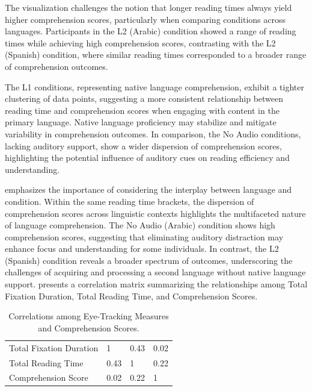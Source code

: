 The visualization challenges the notion that longer reading times always
yield higher comprehension scores, particularly when comparing
conditions across languages. Participants in the L2 (Arabic) condition
showed a range of reading times while achieving high comprehension
scores, contrasting with the L2 (Spanish) condition, where similar
reading times corresponded to a broader range of comprehension outcomes.

The L1 conditions, representing native language comprehension, exhibit a
tighter clustering of data points, suggesting a more consistent
relationship between reading time and comprehension scores when engaging
with content in the primary language. Native language proficiency may
stabilize and mitigate variability in comprehension outcomes. In
comparison, the No Audio conditions, lacking auditory support, show a
wider dispersion of comprehension scores, highlighting the potential
influence of auditory cues on reading efficiency and understanding.

 emphasizes the importance of considering the interplay between
language and condition. Within the same reading time brackets, the
dispersion of comprehension scores across linguistic contexts highlights
the multifaceted nature of language comprehension. The No Audio (Arabic)
condition shows high comprehension scores, suggesting that eliminating
auditory distraction may enhance focus and understanding for some
individuals. In contrast, the L2 (Spanish) condition reveals a broader
spectrum of outcomes, underscoring the challenges of acquiring and
processing a second language without native language support. 
presents a correlation matrix summarizing the relationships among Total
Fixation Duration, Total Reading Time, and Comprehension Scores.

\begin{table}[htbp]
\centering
\begin{threeparttable}
\caption{Correlations among Eye-Tracking Measures and Comprehension Scores.}
\label{tab-06}
\begin{tabular}{llll}
\toprule
Total Fixation Duration & 1 & 0.43 & 0.02 \\
Total Reading Time & 0.43 & 1 & 0.22 \\
Comprehension Score & 0.02 & 0.22 & 1 \\
\bottomrule
\end{tabular}
\end{threeparttable}
\end{table}

